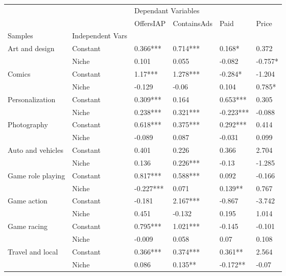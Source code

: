 \begin{table}[h!]
\centering
\begin{tabular}{llllll}
\toprule
          &       & \multicolumn{4}{l}{Dependant Variables} \\
          &       &           OffersIAP & ContainsAds &       Paid &      Price \\
Samples & Independent Vars &                     &             &            &            \\
\midrule
\multirow{2}{*}{Art and design} & Constant &  0.366*** &  0.714*** &  0.168* &  0.372 \\
          & Niche &  0.101 &  0.055 &  -0.082 &  -0.757* \\
\cline{1-6}
\multirow{2}{*}{Comics} & Constant &  1.17*** &  1.278*** &  -0.284* &  -1.204 \\
          & Niche &  -0.129 &  -0.06 &  0.104 &  0.785* \\
\cline{1-6}
\multirow{2}{*}{Personalization} & Constant &  0.309*** &  0.164 &  0.653*** &  0.305 \\
          & Niche &  0.238*** &  0.321*** &  -0.223*** &  -0.088 \\
\cline{1-6}
\multirow{2}{*}{Photography} & Constant &  0.618*** &  0.375*** &  0.292*** &  0.414 \\
          & Niche &  -0.089 &  0.087 &  -0.031 &  0.099 \\
\cline{1-6}
\multirow{2}{*}{Auto and vehicles} & Constant &  0.401 &  0.226 &  0.366 &  2.704 \\
          & Niche &  0.136 &  0.226*** &  -0.13 &  -1.285 \\
\cline{1-6}
\multirow{2}{*}{Game role playing} & Constant &  0.817*** &  0.588*** &  0.092 &  -0.166 \\
          & Niche &  -0.227*** &  0.071 &  0.139** &  0.767 \\
\cline{1-6}
\multirow{2}{*}{Game action} & Constant &  -0.181 &  2.167*** &  -0.867 &  -3.742 \\
          & Niche &  0.451 &  -0.132 &  0.195 &  1.014 \\
\cline{1-6}
\multirow{2}{*}{Game racing} & Constant &  0.795*** &  1.021*** &  -0.145 &  -0.101 \\
          & Niche &  -0.009 &  0.058 &  0.07 &  0.108 \\
\cline{1-6}
\multirow{2}{*}{Travel and local} & Constant &  0.366*** &  0.374*** &  0.361** &  2.564 \\
          & Niche &  0.086 &  0.135** &  -0.172** &  -0.07 \\

\end{tabular}
\end{table}
